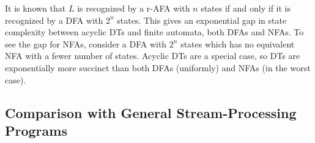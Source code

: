 It is known \cite{chandra1981alternation,fellah1990constructions} that $L$ is recognized by a r-AFA with $n$ states if and only if it is recognized by a DFA with $2^n$ states. This gives an exponential gap in state complexity between acyclic DTs and finite automata, both DFAs and NFAs. To see the gap for NFAs, consider a DFA with $2^n$ states which has no equivalent NFA with a fewer number of states. Acyclic DTs are a special case, so DTs are exponentially more succinct than both DFAs (uniformly) and NFAs (in the worst case).

\subsection{Comparison with General Stream-Processing Programs}
\label{dt:subsec:dts-and-spp}


\newcommand{\Stream}{\textsc{Stream}}

